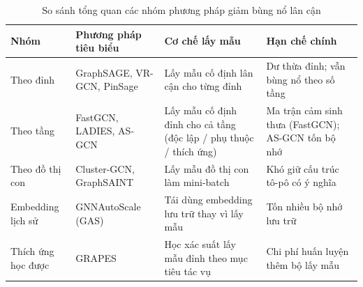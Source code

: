 \begin{table}[H]
\centering
\caption{So sánh tổng quan các nhóm phương pháp giảm bùng nổ lân cận}
\label{tab:sosanh_phuongphap}
\small
\begin{tabular}{p{2.6cm} p{2.4cm} p{3.2cm} p{3.5cm}}
\toprule
\textbf{Nhóm} & \textbf{Phương pháp tiêu biểu} & \textbf{Cơ chế lấy mẫu} & \textbf{Hạn chế chính} \\
\midrule
Theo đỉnh & GraphSAGE, VR-GCN, PinSage & Lấy mẫu cố định lân cận cho từng đỉnh & Dư thừa đỉnh; vẫn bùng nổ theo số tầng \\
\addlinespace
Theo tầng & FastGCN, LADIES, AS-GCN & Lấy mẫu cố định đỉnh cho cả tầng (độc lập / phụ thuộc / thích ứng) & Ma trận cảm sinh thưa (FastGCN); AS-GCN tốn bộ nhớ \\
\addlinespace
Theo đồ thị con & Cluster-GCN, GraphSAINT & Lấy mẫu đồ thị con làm mini-batch & Khó giữ cấu trúc tô-pô có ý nghĩa \\
\addlinespace
Embedding lịch sử & GNNAutoScale (GAS) & Tái dùng embedding lưu trữ thay vì lấy mẫu & Tốn nhiều bộ nhớ lưu trữ \\
\addlinespace
Thích ứng học được & GRAPES & Học xác suất lấy mẫu đỉnh theo mục tiêu tác vụ & Chi phí huấn luyện thêm bộ lấy mẫu \\
\bottomrule
\end{tabular}
\end{table}
